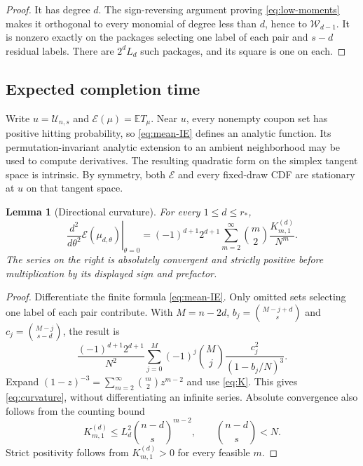 \documentclass[11pt]{article}
\numberwithin{equation}{section}
\newtheorem{lemma}[theorem]{Lemma}
\theoremstyle{remark}
\newcommand{\E}{\mathbb E}
\newcommand{\1}{\mathbf 1}
\newcommand{\U}{\mathcal U}
\begin{document}
\begin{proof}
It has degree $d$. The sign-reversing argument proving \eqref{eq:low-moments} makes it orthogonal to every monomial of degree less than $d$, hence to $\mathcal W_{d-1}$. It is nonzero exactly on the packages selecting one label of each pair and $s-d$ residual labels. There are $2^dL_d$ such packages, and its square is one on each.
\end{proof}

\subsection{Expected completion time}

Write $u=\U_{n,s}$ and $\mathcal E(\mu)=\E T_\mu$. Near $u$, every nonempty coupon set has positive hitting probability, so \eqref{eq:mean-IE} defines an analytic function. Its permutation-invariant analytic extension to an ambient neighborhood may be used to compute derivatives. The resulting quadratic form on the simplex tangent space is intrinsic. By symmetry, both $\mathcal E$ and every fixed-draw CDF are stationary at $u$ on that tangent space.

\begin{lemma}[Directional curvature]\label{lem:curvature}
For every $1\leq d\leq r_*$,
\begin{equation}\label{eq:curvature}
 \left.\frac{d^2}{d\theta^2}\mathcal E(\mu_{d,\theta})\right|_{\theta=0}
 =(-1)^{d+1}2^{d+1}
 \sum_{m=2}^{\infty}\binom m2\frac{K^{(d)}_{m,1}}{N^m}.
\end{equation}
The series on the right is absolutely convergent and strictly positive before multiplication by its displayed sign and prefactor.
\end{lemma}

\begin{proof}
Differentiate the finite formula \eqref{eq:mean-IE}. Only omitted sets selecting one label of each pair contribute. With $M=n-2d$, $b_j=\binom{M-j+d}s$ and $c_j=\binom{M-j}{s-d}$, the result is
\[
 \frac{(-1)^{d+1}2^{d+1}}{N^2}
 \sum_{j=0}^{M}(-1)^j\binom Mj
 \frac{c_j^2}{(1-b_j/N)^3}.
\]
Expand $(1-z)^{-3}=\sum_{m=2}^{\infty}\binom m2z^{m-2}$ and use \eqref{eq:K}. This gives \eqref{eq:curvature}, without differentiating an infinite series. Absolute convergence also follows from the counting bound
\[
 K^{(d)}_{m,1}\leq L_d^2\binom{n-d}{s}^{m-2},
 \qquad \binom{n-d}{s}<N.
\]
Strict positivity follows from $K^{(d)}_{m,1}>0$ for every feasible $m$.
\end{proof}
\end{document}
